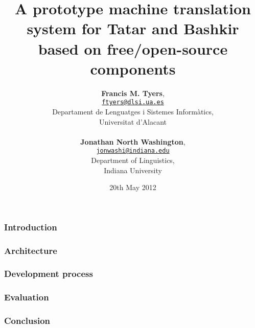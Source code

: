 \documentclass[10pt,xetex]{beamer} %
\date{20th May 2012}
\title{A prototype machine translation system for Tatar and Bashkir \\
              based on free/open-source components}
\author{{\bf Francis M. Tyers},\\ {\tt \href{mailto:ftyers@dlsi.ua.es}{ftyers@dlsi.ua.es}}\\Departament de Lenguatges i Sistemes Informàtics,\\Universitat d'Alacant\\
~\\
{\bf Jonathan North Washington},\\ {\tt \href{mailto:jonwashi@indiana.edu}{jonwashi@indiana.edu}}\\Department of Linguistics,\\Indiana University\\
}
\begin{document}
\begin{frame}
        \titlepage
\end{frame}

\begin{frame}
  \frametitle{Introduction}

\end{frame}

\begin{frame}
  \frametitle{Architecture}

\end{frame}

\begin{frame}
  \frametitle{Development process}

\end{frame}

\begin{frame}
  \frametitle{Evaluation}
\end{frame}

\begin{frame}
  \frametitle{Conclusion}
\end{frame}
\end{document}
